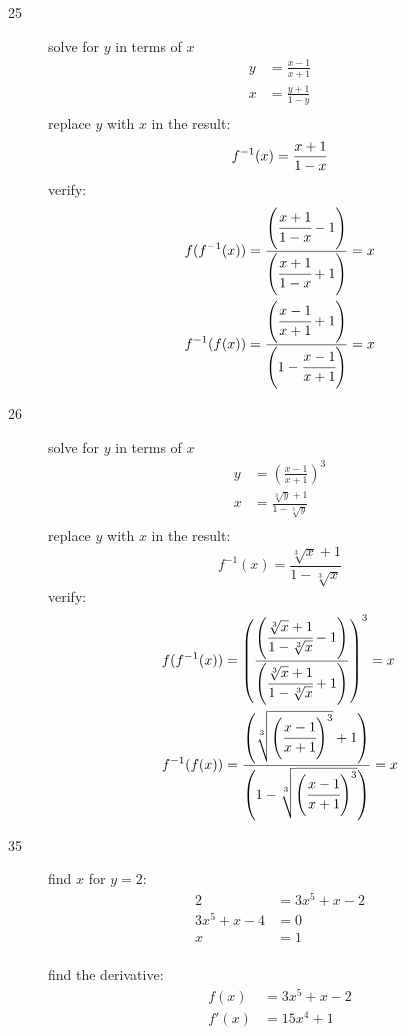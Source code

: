 \documentclass{exam}
\begin{document}
\begin{description}
\item[25]
solve for $y$ in terms of $x$
\begin{align*}
  y &= \frac{x - 1}{x + 1} \\
  x &= \frac{y + 1}{1 - y} \\
\end{align*}
replace $y$ with $x$ in the result:
\[
  f^{-1}(x) = \frac{x + 1}{1 - x} \\
\]
verify:
\begin{align*}
  f(f^{-1}(x)) &= \frac{\left(\cfrac{x + 1}{1 - x} - 1\right)}{\left(\cfrac{x + 1}{1 - x} + 1 \right)} = x \\
  f^{-1}(f(x)) &= \frac{\left(\cfrac{x - 1}{x + 1} + 1 \right)}{\left(1 - \cfrac{x - 1}{x + 1} \right)} = x \\  
\end{align*}

\item[26]
solve for $y$ in terms of $x$
\begin{align*}
  y &= \left( \frac{x - 1}{x + 1} \right)^3 \\
  x &= \frac{\sqrt[3]{y} + 1}{1 - \sqrt[3]{y}} \\
\end{align*}
replace $y$ with $x$ in the result:
\[
  f^{-1}(x) = \frac{\sqrt[3]{x} + 1}{1 - \sqrt[3]{x}}
\]
verify:
\begin{align*}
  f(f^{-1}(x)) &= \left(\frac{ \left(\cfrac{\sqrt[3]{x} + 1}{1 - \sqrt[3]{x}} - 1 \right)}
                            { \left(\cfrac{\sqrt[3]{x} + 1}{1 - \sqrt[3]{x}} + 1 \right)} \right)^3 = x \\
  f^{-1}(f(x)) &= \frac{\left( \sqrt[3]{\left( \cfrac{x - 1}{x + 1} \right)^3} + 1 \right)}
                        {\left(1 - \sqrt[3]{\left( \cfrac{x - 1}{x + 1} \right)^3} \right)} = x \\  
\end{align*}

\item[35]
find $x$ for $y = 2$:
\begin{align*}
  2 &= 3x^5 + x - 2 \\
  3x^5 + x - 4 &= 0 \\
  x &= 1 \\
\end{align*}

find the derivative:
\begin{align*}
  f(x) &= 3x^5 + x - 2 \\
  f'(x) &= 15x^4 + 1 \\
\end{align*}


\end{description}
\end{document}
